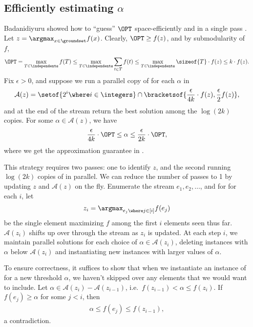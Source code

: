 \documentclass[oneside,letterpaper]{scrartcl} \usepackage{macros}
\begin{document}
\subsection{Efficiently estimating $\alpha$}
\newcommand{\thresholds}{\mathcal{A}}

Badanidiyuru \etal showed how to ``guess'' $\OPT$ space-efficiently
and in a single pass \cite{bmkk-sso-14}. Let $z = \argmax_{x \in
  \groundset} f(x)$. Clearly, $\OPT \geq f(z)$, and by submodularity
of $f$,
\begin{align*}
  \OPT = \max_{T \in \independents} f(T) \leq \max_{T \in
    \independents} \sum_{t \in T} f(t) \leq \max_{T \in \independents}
  \sizeof{T} \cdot f(z) \leq k \cdot f(z).
\end{align*}
Fix $\epsilon > 0$, and suppose we run a parallel copy of
 for each $\alpha$ in
\begin{align*}
  \thresholds(z) = \setof{2^i \where i \in \integers} \cap \bracketsof{\frac{\epsilon}{4k} \cdot f(z), \frac{\epsilon}{2}
    f(z)},
\end{align*}
and at the end of the stream return the best solution among the $\log
(2k)$ copies. For some $\alpha \in \thresholds(z)$, we have
\begin{align*}
  \frac{\epsilon}{4k} \cdot \OPT \leq \alpha \leq \frac{\epsilon}{2k}
  \cdot \OPT,
\end{align*}
where we get the approximation guarantee in
.

This strategy requires two passes: one to identify $z$, and the second
running $\log(2k)$ copies of
in parallel.  We can reduce the number of passes to 1 by updating $z$
and $\thresholds(z)$ on the fly. Enumerate the stream $e_1,e_2,\dots$,
and for for each $i$, let
\begin{align*}
  z_i = \argmax_{e_j \where j \in [i]} f(e_j)
\end{align*}
be the single element maximizing $f$ among the first $i$ elements seen
thus far. $\thresholds(z_i)$ shifts up over through the stream as
$z_i$ is updated. At each step $i$, we maintain parallel solutions for
each choice of $\alpha \in \thresholds(z_i)$, deleting instances with
$\alpha$ below $\thresholds(z_i)$ and instantiating new instances with
larger values of $\alpha$.

To ensure correctness, it suffices to show that when we instantiate an
instance of
for a new threshold $\alpha$, we haven't skipped over any elements
that we would want to include. Let $\alpha \in \thresholds(z_i) -
\thresholds(z_{i-1})$, i.e.\ $f(z_{i-1}) < \alpha \leq f(z_i)$. If
$f(e_j) \geq \alpha$ for some $j < i$, then
\begin{align*}
  \alpha \leq f(e_j) \leq f(z_{i-1}),
\end{align*}
a contradiction.
\end{document}
